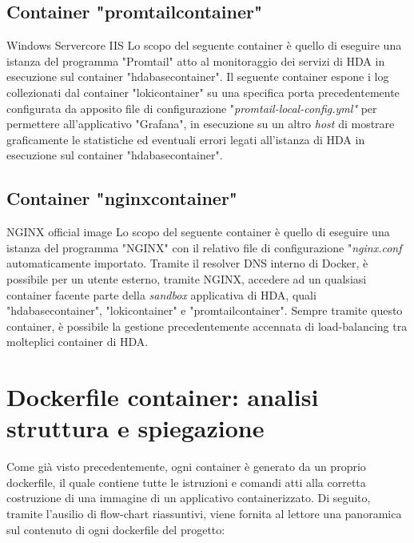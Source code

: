 \subsection{Container "promtailcontainer"}
\begin{namespacedesc}
	 {Windows Servercore IIS}
	 {Lo scopo del seguente container è quello di eseguire una istanza del programma "Promtail" atto al monitoraggio dei servizi di HDA in esecuzione sul container "hdabasecontainer". Il seguente container espone i log collezionati dal container "lokicontainer" su una specifica porta precedentemente configurata da apposito file di configurazione "\textit{promtail-local-config.yml"} per permettere all'applicativo "Grafana", in esecuzione su un altro \textit{host} di mostrare graficamente le statistiche ed eventuali errori legati all'istanza di HDA in esecuzione sul container "hdabasecontainer".}
\end{namespacedesc}	

\subsection{Container "nginxcontainer"}
\begin{namespacedesc}
	 {NGINX official image}
	 {Lo scopo del seguente container è quello di eseguire una istanza del programma "NGINX" con il relativo file di configurazione "\textit{nginx.conf} automaticamente importato. Tramite il resolver DNS interno di Docker, è possibile per un utente esterno, tramite NGINX, accedere ad un qualsiasi container facente parte della \textit{sandbox} applicativa di HDA, quali "hdabasecontainer", "lokicontainer" e "promtailcontainer". Sempre tramite questo container, è possibile la gestione precedentemente accennata di load-balancing tra molteplici container di HDA.}
\end{namespacedesc}

\newpage	

\section{Dockerfile container: analisi struttura e spiegazione}
Come già visto precedentemente, ogni container è generato da un proprio dockerfile, il quale contiene tutte le istruzioni e comandi atti alla corretta costruzione di una immagine di un applicativo containerizzato.
Di seguito, tramite l'ausilio di \gls{flow-chart} riassuntivi, viene fornita al lettore una panoramica sul contenuto di ogni dockerfile del progetto:
